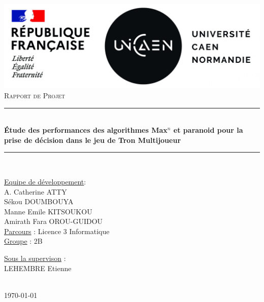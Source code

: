 \documentclass[a4paper,12pt]{article}
\newcommand{\HRule}{\rule{\linewidth}{0.5mm}}
\begin{document}
\thispagestyle{empty}
\begin{titlepage}
	\begin{center}
		\includegraphics[scale=0.2]{Images/logos-Marianne-UNICAEN-scaled.jpg}\\[1.5cm]

		\textsc{\Large Rapport de Projet}\\[1.5cm]

		\HRule \\[0.4cm]
		{
		\Large \bfseries Étude des performances des algorithmes Max$^n$ et paranoid 
		pour la prise de décision dans le jeu de Tron Multijoueur
		 \\[0.2cm]
		}
		\HRule \\[0.5cm]
	\end{center}

	\begin{minipage}[c]{0.5\linewidth}
		\begin{flushleft}
			\underline{Equipe de développement}: \\[0.5cm]
			A. Catherine ATTY\\[0.2cm]
			Sékou DOUMBOUYA\\[0.2cm]
			Manne Emile KITSOUKOU\\[0.2cm]
			Amirath Fara OROU-GUIDOU\\[0.5cm]
			\underline{Parcours} : Licence 3 Informatique\\[0.2cm]
			\underline{Groupe} : 2B\\
		\end{flushleft}
	\end{minipage}

	\begin{minipage}[c]{\linewidth}
		\begin{flushright}
			\underline{Sous la supervison} :\\[0.5cm]
			LEHEMBRE Etienne\\[0.2cm]
		\end{flushright}
	\end{minipage}\\[0.7cm]

	\center \today
\end{titlepage}
\thispagestyle{empty}
\tableofcontents
\newpage
\end{document}
